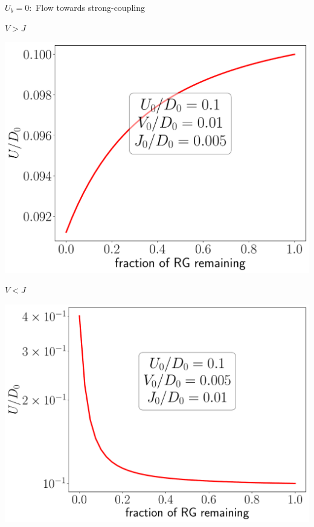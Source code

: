 \documentclass[aspectratio=169]{beamer}
\begin{document}
\begin{frame}[noframenumbering]{\(U_b = 0:\) Flow towards strong-coupling}
{%

\begin{minipage}{0.49\textwidth}
\centering
{\large\( V > J\)}

\includegraphics[width=\textwidth]{figures/U_irr,U>0,U.pdf}
\end{minipage}
\begin{minipage}{0.49\textwidth}
\centering
{\large\( V < J\)}

\includegraphics[width=\textwidth]{figures/U_rel,U>0,U.pdf}
\end{minipage}
}

\end{frame}
\end{document}
